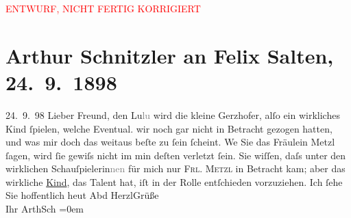 
\begin{center}
            \textcolor{red}{ENTWURF, NICHT FERTIG KORRIGIERT}
                      \end{center}
            
         
         \renewcommand{\erwaehntePersonen}{Personen: Camilla Gerzhofer, Felix Salten, Ottilie Salten}
         \renewcommand{\erwaehnteOrte}{Orte: Wien}
         \renewcommand{\erwaehnteWerke}{Werke: Das Vermächtnis. Schauspiel in drei Akten}
               \section[Arthur Schnitzler an Felix Salten, 24. 9. 1898]{ Arthur Schnitzler an Felix Salten, 24. 9. 1898}\nopagebreak{}\rehead{ }\begin{ledgroupsized}[t]{13cm}\normalsize\beginnumbering \toendnotes[C]{\smallbreak\pagebreak[2]} 
\toendnotes[C]{\smallbreak}\pstart
           \raggedleft{}{\pb}24. 9. 98\pend
           \pstart{}Lieber Freund,\pend\pstart
           den Lu\textcolor{gray}{lu} wird die kleine Gerzhofer, alſo ein
               wirkliches Kind ſpielen, welche Eventual. wir noch gar nicht in Betracht gezogen
               hatten, und was mir {\pb}doch das weitaus beſte
               zu ſein ſcheint. We{\geminationn} Sie das Fräulein Metzl ſagen, wird ſie gewiſs nicht im min deſten verletzt
               ſein. Sie wiſſen, daſs unter den wirklichen Schauſpielerin\textcolor{gray}{nen} für
               mich nur \textsc{Frl. Metzl} in {\pb}Betracht kam; aber das wirkliche
                  \uline{Kind}, das Talent hat, iſt in der Rolle entſchieden
               vorzuziehen. \pend
           \pstart
           Ich ſehe Sie hoffentlich heut Abd \pend
           \pstart
           HerzlGrüße {\\[\baselineskip]}Ihr \spacefill\mbox{ArthSch}\pend
           \leftskip=0em{}
         
         \endnumbering{}\end{ledgroupsized}\begin{anhang}\end{anhang}\newcommand{\dateiname}{L02966}\newcommand{\titel}{Arthur Schnitzler an Felix Salten, 24. 9. 1898}\newcommand{\editorInnen}{Martin Anton Müller und Laura Untner}
      